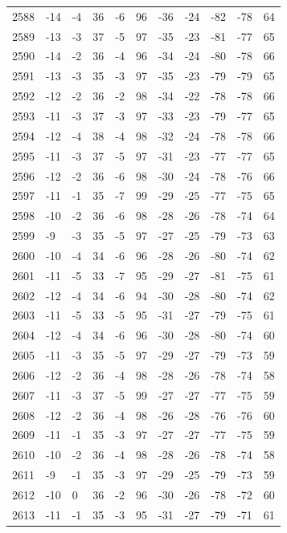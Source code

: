 \begin{table}[H]
\begin{tabular}{lllllllllll}
2588 & -14 & -4 & 36 & -6 & 96 & -36 & -24 & -82 & -78 & 64 \\
2589 & -13 & -3 & 37 & -5 & 97 & -35 & -23 & -81 & -77 & 65 \\
2590 & -14 & -2 & 36 & -4 & 96 & -34 & -24 & -80 & -78 & 66 \\
2591 & -13 & -3 & 35 & -3 & 97 & -35 & -23 & -79 & -79 & 65 \\
2592 & -12 & -2 & 36 & -2 & 98 & -34 & -22 & -78 & -78 & 66 \\
2593 & -11 & -3 & 37 & -3 & 97 & -33 & -23 & -79 & -77 & 65 \\
2594 & -12 & -4 & 38 & -4 & 98 & -32 & -24 & -78 & -78 & 66 \\
2595 & -11 & -3 & 37 & -5 & 97 & -31 & -23 & -77 & -77 & 65 \\
2596 & -12 & -2 & 36 & -6 & 98 & -30 & -24 & -78 & -76 & 66 \\
2597 & -11 & -1 & 35 & -7 & 99 & -29 & -25 & -77 & -75 & 65 \\
2598 & -10 & -2 & 36 & -6 & 98 & -28 & -26 & -78 & -74 & 64 \\
2599 & -9 & -3 & 35 & -5 & 97 & -27 & -25 & -79 & -73 & 63 \\
2600 & -10 & -4 & 34 & -6 & 96 & -28 & -26 & -80 & -74 & 62 \\
2601 & -11 & -5 & 33 & -7 & 95 & -29 & -27 & -81 & -75 & 61 \\
2602 & -12 & -4 & 34 & -6 & 94 & -30 & -28 & -80 & -74 & 62 \\
2603 & -11 & -5 & 33 & -5 & 95 & -31 & -27 & -79 & -75 & 61 \\
2604 & -12 & -4 & 34 & -6 & 96 & -30 & -28 & -80 & -74 & 60 \\
2605 & -11 & -3 & 35 & -5 & 97 & -29 & -27 & -79 & -73 & 59 \\
2606 & -12 & -2 & 36 & -4 & 98 & -28 & -26 & -78 & -74 & 58 \\
2607 & -11 & -3 & 37 & -5 & 99 & -27 & -27 & -77 & -75 & 59 \\
2608 & -12 & -2 & 36 & -4 & 98 & -26 & -28 & -76 & -76 & 60 \\
2609 & -11 & -1 & 35 & -3 & 97 & -27 & -27 & -77 & -75 & 59 \\
2610 & -10 & -2 & 36 & -4 & 98 & -28 & -26 & -78 & -74 & 58 \\
2611 & -9 & -1 & 35 & -3 & 97 & -29 & -25 & -79 & -73 & 59 \\
2612 & -10 & 0 & 36 & -2 & 96 & -30 & -26 & -78 & -72 & 60 \\
2613 & -11 & -1 & 35 & -3 & 95 & -31 & -27 & -79 & -71 & 61 \\

\end{tabular}
\end{table}

